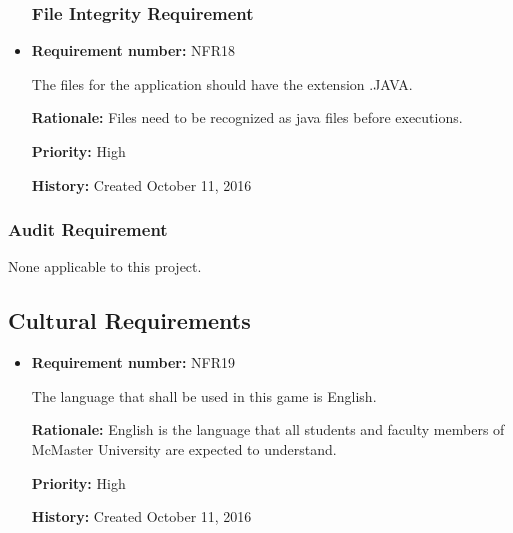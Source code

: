 \documentclass[12pt,letterpaper]{article}
\begin{document}
\begin{reqbox}
	\begin{itemize}

\subsubsection{File Integrity Requirement}

	\item \textbf{Requirement number: }NFR18  
	
	The files for the application should have the extension .JAVA.

	\textbf{Rationale: }Files need to be recognized as java files before executions.
	
	\textbf{Priority: }High     
	 
	\textbf{History: }Created October 11, 2016  
	\end{itemize}
\end{reqbox}

\begin{reqbox}
	\begin{itemize}

\subsubsection{Audit Requirement}
None applicable to this project.

	\end{itemize}
\end{reqbox}

\subsection{Cultural Requirements}

\begin{reqbox}
	\begin{itemize}
	\item \textbf{Requirement number: }NFR19 
	
	The language that shall be used in this game is English.

	\textbf{Rationale: }English is the language that all students and faculty members of McMaster University are expected to understand.

	\textbf{Priority: }High
	
	\textbf{History: }Created October 11, 2016
	\end{itemize}
\end{reqbox}
\end{document}
